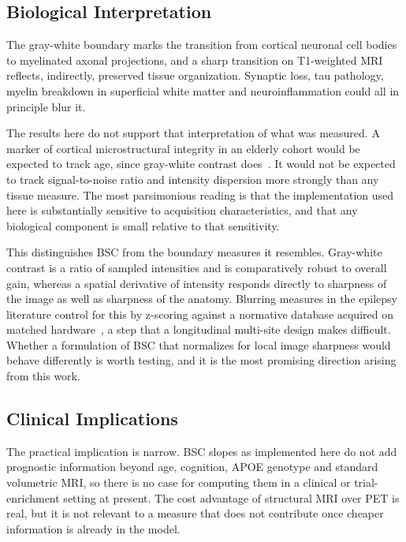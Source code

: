 \documentclass[blue]{ludusofficial}  %
\begin{document}
\subsection{Biological Interpretation}

The gray-white boundary marks the transition from cortical neuronal cell bodies to myelinated axonal projections, and a sharp transition on T1-weighted MRI reflects, indirectly, preserved tissue organization. Synaptic loss, tau pathology, myelin breakdown in superficial white matter and neuroinflammation could all in principle blur it.

The results here do not support that interpretation of what was measured. A marker of cortical microstructural integrity in an elderly cohort would be expected to track age, since gray-white contrast does~\cite{salat2009age}. It would not be expected to track signal-to-noise ratio and intensity dispersion more strongly than any tissue measure. The most parsimonious reading is that the implementation used here is substantially sensitive to acquisition characteristics, and that any biological component is small relative to that sensitivity.

This distinguishes BSC from the boundary measures it resembles. Gray-white contrast is a ratio of sampled intensities and is comparatively robust to overall gain, whereas a spatial derivative of intensity responds directly to sharpness of the image as well as sharpness of the anatomy. Blurring measures in the epilepsy literature control for this by z-scoring against a normative database acquired on matched hardware~\cite{huppertz2005enhanced,blackmon2015cortical}, a step that a longitudinal multi-site design makes difficult. Whether a formulation of BSC that normalizes for local image sharpness would behave differently is worth testing, and it is the most promising direction arising from this work.

\subsection{Clinical Implications}

The practical implication is narrow. BSC slopes as implemented here do not add prognostic information beyond age, cognition, APOE genotype and standard volumetric MRI, so there is no case for computing them in a clinical or trial-enrichment setting at present. The cost advantage of structural MRI over PET is real, but it is not relevant to a measure that does not contribute once cheaper information is already in the model.
\end{document}
